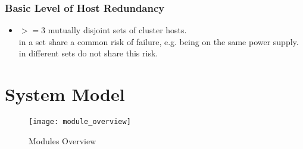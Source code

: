 \documentclass[a4paper, 11pt]{article}
\begin{document}
\subsubsection{Basic Level of Host Redundancy}
\begin{itemize}
	\item $>= 3$ mutually disjoint sets of \gls{cluster} \glspl{host}. \\  in a set share a common risk of failure, e.g. being on the same power supply.  in different sets do not share this risk.
\end{itemize}

\section{System Model}
\begin{figure}[H]
\texttt{[image: module\_overview]}
\caption{\mamid Modules Overview}
\end{figure}
\end{document}
